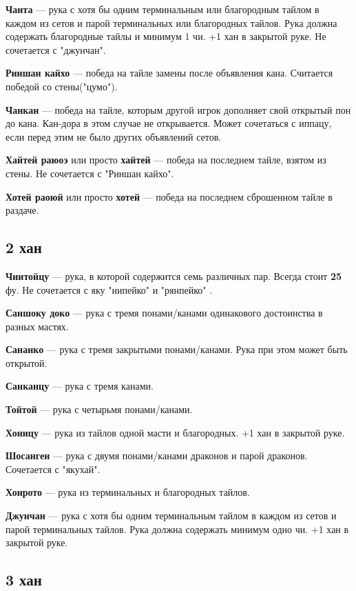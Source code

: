 \textbf{Чанта} --- рука с хотя бы одним терминальным или благородным тайлом в каждом из сетов и парой терминальных или благородных тайлов.  Рука должна содержать благородные тайлы и минимум 1 чи. +1 хан в закрытой руке. Не сочетается с "джунчан".

\textbf{Риншан кайхо} --- победа на тайле замены после объявления кана. Считается победой со стены("цумо"). 

\textbf{Чанкан} --- победа на тайле, которым другой игрок дополняет свой открытый пон до кана. Кан-дора в этом случае не открывается. Может сочетаться с иппацу, если перед этим не было других объявлений сетов.

\textbf{Хайтей раюоэ} или просто \textbf{хайтей} --- победа на последнем тайле, взятом из стены. Не сочетается с "Риншан кайхо".

\textbf{Хотей раоюй} или просто \textbf{хотей} --- победа на последнем сброшенном тайле в раздаче.

\subsection{2 хан}
\textbf{Чиитойцу} --- рука, в которой содержится семь различных пар. Всегда стоит \textbf{25} фу. Не сочетается с яку "иипейко"  и "рянпейко" .

\textbf{Саншоку доко} --- рука с тремя понами/канами одинакового достоинства в разных мастях.


\textbf{Сананко} --- рука с тремя закрытыми понами/канами. Рука при этом может быть открытой.

\textbf{Санканцу} --- рука с тремя канами.

\textbf{Тойтой} --- рука с четырьмя понами/канами.

\textbf{Хоницу} --- рука из  тайлов одной масти и благородных. +1 хан в закрытой руке. 

\textbf{Шосанген} --- рука с двумя понами/канами драконов и парой  драконов. Сочетается с "якухай".

\textbf{Хонрото} --- рука из терминальных и благородных тайлов.

\textbf{Джунчан} --- рука с хотя бы одним терминальным тайлом в каждом из сетов и парой терминальных тайлов.  Рука должна содержать минимум одно чи. +1 хан в закрытой руке. 

\subsection{3 хан}

